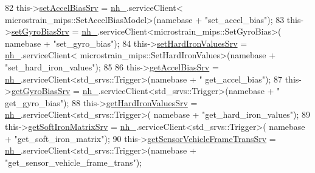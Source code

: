 \begin{DoxyCode}
82                 this->\hyperlink{classcl__microstrain__mips_1_1ClMicrostainMips_ae2ea11655cba06e49307780d1f95e197}{setAccelBiasSrv} = \hyperlink{classcl__microstrain__mips_1_1ClMicrostainMips_a5a39ba0864ba2c4c003b6ea427538243}{nh\_}.serviceClient<
      microstrain\_mips::SetAccelBiasModel>(namebase + \textcolor{stringliteral}{"set\_accel\_bias"});
83                 this->\hyperlink{classcl__microstrain__mips_1_1ClMicrostainMips_a29fcea0897ca3bd7a036ab5c1856b86c}{setGyroBiasSrv} = \hyperlink{classcl__microstrain__mips_1_1ClMicrostainMips_a5a39ba0864ba2c4c003b6ea427538243}{nh\_}.serviceClient<microstrain\_mips::SetGyroBias>(
      namebase + \textcolor{stringliteral}{"set\_gyro\_bias"});
84                 this->\hyperlink{classcl__microstrain__mips_1_1ClMicrostainMips_abab500a095515c133d5edfea23736fad}{setHardIronValuesSrv} = \hyperlink{classcl__microstrain__mips_1_1ClMicrostainMips_a5a39ba0864ba2c4c003b6ea427538243}{nh\_}.serviceClient<
      microstrain\_mips::SetHardIronValues>(namebase + \textcolor{stringliteral}{"set\_hard\_iron\_values"});
85 
86                 this->\hyperlink{classcl__microstrain__mips_1_1ClMicrostainMips_a79547e77f9122ca67610f153657ec8ac}{getAccelBiasSrv} = \hyperlink{classcl__microstrain__mips_1_1ClMicrostainMips_a5a39ba0864ba2c4c003b6ea427538243}{nh\_}.serviceClient<std\_srvs::Trigger>(namebase + \textcolor{stringliteral}{"
      get\_accel\_bias"});
87                 this->\hyperlink{classcl__microstrain__mips_1_1ClMicrostainMips_a2f3eaec7f31a54d833773ebb5eb03b64}{getGyroBiasSrv} = \hyperlink{classcl__microstrain__mips_1_1ClMicrostainMips_a5a39ba0864ba2c4c003b6ea427538243}{nh\_}.serviceClient<std\_srvs::Trigger>(namebase + \textcolor{stringliteral}{"
      get\_gyro\_bias"});
88                 this->\hyperlink{classcl__microstrain__mips_1_1ClMicrostainMips_a11169f770102e9cff7f3b45c96fb4881}{getHardIronValuesSrv} = \hyperlink{classcl__microstrain__mips_1_1ClMicrostainMips_a5a39ba0864ba2c4c003b6ea427538243}{nh\_}.serviceClient<std\_srvs::Trigger>(
      namebase + \textcolor{stringliteral}{"get\_hard\_iron\_values"});
89                 this->\hyperlink{classcl__microstrain__mips_1_1ClMicrostainMips_a7210454a851669073d06d82511014ecc}{getSoftIronMatrixSrv} = \hyperlink{classcl__microstrain__mips_1_1ClMicrostainMips_a5a39ba0864ba2c4c003b6ea427538243}{nh\_}.serviceClient<std\_srvs::Trigger>(
      namebase + \textcolor{stringliteral}{"get\_soft\_iron\_matrix"});
90                 this->\hyperlink{classcl__microstrain__mips_1_1ClMicrostainMips_abeafc4f48f26ddd264e61b6cf97c779f}{getSensorVehicleFrameTransSrv} = 
      \hyperlink{classcl__microstrain__mips_1_1ClMicrostainMips_a5a39ba0864ba2c4c003b6ea427538243}{nh\_}.serviceClient<std\_srvs::Trigger>(namebase + \textcolor{stringliteral}{"get\_sensor\_vehicle\_frame\_trans"});

\end{DoxyCode}
